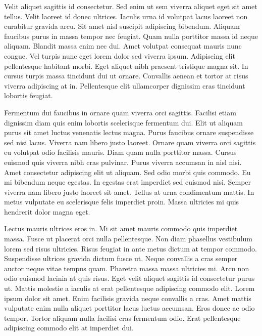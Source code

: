 \documentclass[11pt,a4paper]{article}
\begin{document}
Velit aliquet sagittis id consectetur. Sed enim ut sem viverra aliquet eget sit amet tellus. Velit laoreet id donec ultrices. Iaculis urna id volutpat lacus laoreet non curabitur gravida arcu. Sit amet nisl suscipit adipiscing bibendum. Aliquam faucibus purus in massa tempor nec feugiat. Quam nulla porttitor massa id neque aliquam. Blandit massa enim nec dui. Amet volutpat consequat mauris nunc congue. Vel turpis nunc eget lorem dolor sed viverra ipsum. Adipiscing elit pellentesque habitant morbi. Eget aliquet nibh praesent tristique magna sit. In cursus turpis massa tincidunt dui ut ornare. Convallis aenean et tortor at risus viverra adipiscing at in. Pellentesque elit ullamcorper dignissim cras tincidunt lobortis feugiat.

Fermentum dui faucibus in ornare quam viverra orci sagittis. Facilisi etiam dignissim diam quis enim lobortis scelerisque fermentum dui. Elit ut aliquam purus sit amet luctus venenatis lectus magna. Purus faucibus ornare suspendisse sed nisi lacus. Viverra nam libero justo laoreet. Ornare quam viverra orci sagittis eu volutpat odio facilisis mauris. Diam quam nulla porttitor massa. Cursus euismod quis viverra nibh cras pulvinar. Purus viverra accumsan in nisl nisi. Amet consectetur adipiscing elit ut aliquam. Sed odio morbi quis commodo. Eu mi bibendum neque egestas. In egestas erat imperdiet sed euismod nisi. Semper viverra nam libero justo laoreet sit amet. Tellus at urna condimentum mattis. In metus vulputate eu scelerisque felis imperdiet proin. Massa ultricies mi quis hendrerit dolor magna eget.

Lectus mauris ultrices eros in. Mi sit amet mauris commodo quis imperdiet massa. Fusce ut placerat orci nulla pellentesque. Non diam phasellus vestibulum lorem sed risus ultricies. Risus feugiat in ante metus dictum at tempor commodo. Suspendisse ultrices gravida dictum fusce ut. Neque convallis a cras semper auctor neque vitae tempus quam. Pharetra massa massa ultricies mi. Arcu non odio euismod lacinia at quis risus. Eget velit aliquet sagittis id consectetur purus ut. Mattis molestie a iaculis at erat pellentesque adipiscing commodo elit. Lorem ipsum dolor sit amet. Enim facilisis gravida neque convallis a cras. Amet mattis vulputate enim nulla aliquet porttitor lacus luctus accumsan. Eros donec ac odio tempor. Tortor aliquam nulla facilisi cras fermentum odio. Erat pellentesque adipiscing commodo elit at imperdiet dui.
\end{document}
